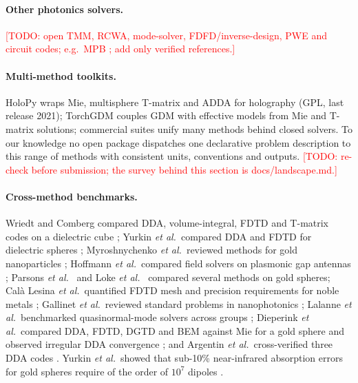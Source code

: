 \documentclass[11pt]{article}
\newcommand{\todo}[1]{\textcolor{red}{[TODO: #1]}}
\begin{document}
\paragraph{Other photonics solvers.} \todo{open TMM, RCWA, mode-solver, FDFD/inverse-design, PWE
and circuit codes; e.g.\ MPB \cite{JohnsonJoannopoulos2001mpb}; add only verified references.}

\paragraph{Multi-method toolkits.}
HoloPy wraps Mie, multisphere T-matrix and ADDA for holography (GPL, last release 2021); TorchGDM
couples GDM with effective models from Mie and T-matrix solutions; commercial suites unify many
methods behind closed solvers. To our knowledge no open package dispatches one declarative
problem description to this range of methods with consistent units, conventions and outputs.
\todo{re-check before submission; the survey behind this section is docs/landscape.md.}

\paragraph{Cross-method benchmarks.}
Wriedt and Comberg compared DDA, volume-integral, FDTD and T-matrix codes on a dielectric cube
\cite{WriedtComberg1998}; Yurkin \emph{et al.}\ compared DDA and FDTD for dielectric spheres
\cite{Yurkin2007ddafdtd}; Myroshnychenko \emph{et al.}\ reviewed methods for gold nanoparticles
\cite{Myroshnychenko2008}; Hoffmann \emph{et al.}\ compared field solvers on plasmonic gap antennas
\cite{Hoffmann2009}; Parsons \emph{et al.}\ \cite{Parsons2010} and Loke \emph{et al.}\
\cite{Loke2014} compared several methods on gold spheres; Cal\`a Lesina \emph{et al.}\ quantified
FDTD mesh and precision requirements for noble metals \cite{CalaLesina2015}; Gallinet \emph{et
al.}\ reviewed standard problems in nanophotonics \cite{Gallinet2015}; Lalanne \emph{et al.}\
benchmarked quasinormal-mode solvers across groups \cite{Lalanne2019}; Dieperink \emph{et al.}\
compared DDA, FDTD, DGTD and BEM against Mie for a gold sphere and observed irregular DDA
convergence \cite{Dieperink2024}; and Argentin \emph{et al.}\ cross-verified three DDA codes
\cite{Argentin2026ddabench}. Yurkin \emph{et al.}\ showed that sub-10\% near-infrared absorption
errors for gold spheres require of the order of $10^7$ dipoles \cite{Yurkin2010gold}.
\end{document}
